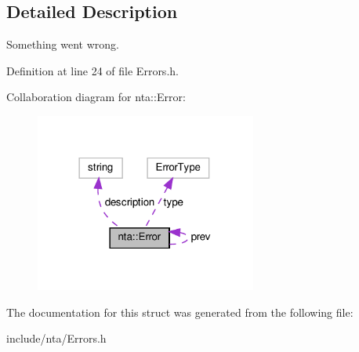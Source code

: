 \subsection{Detailed Description}
Something went wrong. 

Definition at line 24 of file Errors.\+h.



Collaboration diagram for nta\+:\+:Error\+:\nopagebreak
\begin{figure}[H]
\begin{center}
\leavevmode
\includegraphics[width=206pt]{d7/dbb/structnta_1_1Error__coll__graph}
\end{center}
\end{figure}


The documentation for this struct was generated from the following file\+:\begin{DoxyCompactItemize}
\item 
include/nta/Errors.\+h\end{DoxyCompactItemize}
